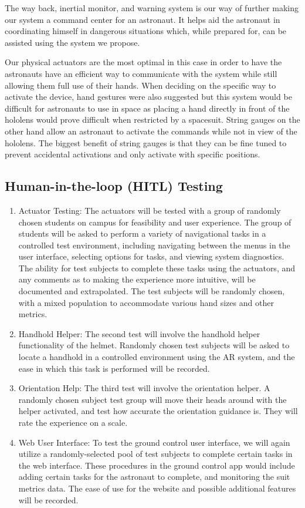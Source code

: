 \documentclass{article}
\let\Oldsubsection\subsection
\renewcommand{\subsection}{\FloatBarrier\Oldsubsection}
\begin{document}
The way back, inertial monitor, and warning system is our way of further making our system a command center for an astronaut. It helps aid the astronaut in coordinating himself in dangerous situations which, while prepared for, can be assisted using the system we propose.

Our physical actuators are the most optimal in this case in order to have the astronauts have an efficient way to communicate with the system while still allowing them full use of their hands. When deciding on the specific way to activate the device, hand gestures were also suggested but this system would be difficult for astronauts to use in space as placing a hand directly in front of the hololens would prove difficult when restricted by a spacesuit. String gauges on the other hand allow an astronaut to activate the commands while not in view of the hololens. The biggest benefit of string gauges is that they can be fine tuned to prevent accidental activations and only activate with specific positions.

\subsection{Human-in-the-loop (HITL) Testing}

\begin{enumerate}
\item Actuator Testing: The actuators will be tested with a group of randomly chosen students on campus for feasibility and user experience. The group of students will be asked to perform a variety of navigational tasks in a controlled test environment, including navigating between the menus in the user interface, selecting options for tasks, and viewing system diagnostics. The ability for test subjects to complete these tasks using the actuators, and any comments as to making the experience more intuitive, will be documented and extrapolated. The test subjects will be randomly chosen, with a mixed population to accommodate various hand sizes and other metrics.
\item Handhold Helper: The second test will involve the handhold helper functionality of the helmet. Randomly chosen test subjects will be asked to locate a handhold in a controlled environment using the AR system, and the ease in which this task is performed will be recorded.
\item Orientation Help: The third test will involve the orientation helper. A randomly chosen subject test group will move their heads around with the helper activated, and test how accurate the orientation guidance is. They will rate the experience on a scale.
\item Web User Interface: To test the ground control user interface, we will again utilize a randomly-selected pool of test subjects to complete certain tasks in the web interface. These procedures in the ground control app would include adding certain tasks for the astronaut to complete, and monitoring the suit metrics data. The ease of use for the website and possible additional features will be recorded.
\end{enumerate}
\end{document}
